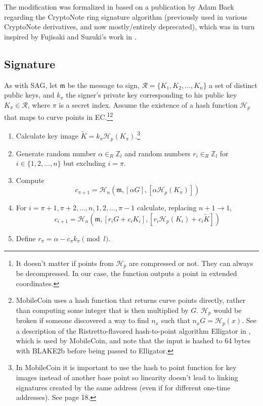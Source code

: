 The modification was formalized in \cite{MRL-0005-ringct} based on a publication by Adam Back \cite{AdamBack-ring-efficiency} regarding the CryptoNote \cite{cryptoNoteWhitePaper} ring signature algorithm (previously used in various CryptoNote derivatives, and now mostly/entirely deprecated), which was in turn inspired by Fujisaki and Suzuki's work in \cite{Fujisaki2007}.


\subsection*{Signature}

As with SAG, let \(\mathfrak{m}\) be the message to sign, \(\mathcal{R} = \{K_1, K_2, ..., K_n\}\) a set of distinct public keys, and \(k_\pi\) the signer's private key corresponding to his public key \(K_\pi \in \mathcal{R}\), where $\pi$ is a secret index. Assume the existence of a hash function \(\mathcal{H}_p\) that maps to curve points in EC.\footnote{It doesn’t matter if points from $\mathcal{H}_p$ are compressed or not. They can always be decompressed. In our case, the function outputs a point in extended coordinates.}\footnote{MobileCoin uses a hash function that returns curve points directly, rather than computing some integer that is then multiplied by $G$. $\mathcal{H}_p$ would be broken if someone discovered a way to find $n_x$ such that $n_x G = \mathcal{H}_p(x)$. See a description of the Ristretto-flavored hash-to-point algorithm Elligator in \cite{ristretto-elligator}, which is used by MobileCoin, and note that the input is hashed to 64 bytes with BLAKE2b before being passed to Elligator.}

\begin{enumerate}
	\item Calculate key image \(\tilde{K} = k_\pi \mathcal{H}_p(K_\pi)\).\footnote{In MobileCoin it is important to use the hash to point function for key images instead of another base point so linearity doesn't lead to linking signatures created by the same address (even if for different one-time addresses). See \cite{cryptoNoteWhitePaper} page 18.}

	\item Generate random number \(\alpha \in_R \mathbb{Z}_l\) and random numbers \(r_i \in_R \mathbb{Z}_l\) for \(i \in \{1, 2, ..., n\}\) but excluding \(i = \pi\).

	\item Compute
	\[c_{\pi+1} = \mathcal{H}_n(\mathfrak{m}, [\alpha G], [\alpha \mathcal{H}_p(K_\pi)])\]

	\item For \(i = \pi+1, \pi+2, ..., n, 1, 2, ..., \pi-1\) calculate, replacing \(n + 1 \rightarrow 1\),\vspace{.175cm}
	\[c_{i+1} = \mathcal{H}_n(\mathfrak{m}, [r_i G + c_i K_i], [r_i \mathcal{H}_p(K_i) + c_i \tilde{K}])\]

	\item Define \(r_\pi = \alpha - c_\pi k_\pi \pmod l\).
\end{enumerate}

